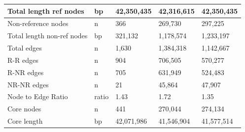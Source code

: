 \documentclass[../main.tex]{subfiles}
\begin{document}
\begin{table}[!htb]
\begin{center}
\begin{tabular}{|l|l|l|l|l|}
   \hline
   Total length ref nodes                    & bp                                 & 42,350,435                                       & 42,316,615                                  & 42,350,435                                     \\ 
   \hline
   Non-reference nodes                       & n                                  & 366                                              & 269,730                                     & 297,225                                        \\ 
   \hline
   Total length non-ref nodes                & bp                                 & 321,132                                          & 1,178,574                                   & 1,233,197                                      \\ 
   \hline
   Total edges                               & n                                  & 1,630                                            & 1,384,318                                   & 1,142,667                                      \\ 
   \hline
   R-R edges                                 & n                                  & 904                                              & 706,505                                     & 570,277                                        \\ 
   \hline
   R-NR edges                                & n                                  & 705                                              & 631,949                                     & 524,483                                        \\ 
   \hline
   NR-NR edges                               & n                                  & 21                                               & 45,864                                      & 47,907                                         \\ 
   \hline
   Node to Edge Ratio                        & ratio                              & 1.43                                             & 1.72                                        & 1.35                                           \\ 
   \hline
   Core nodes                                & n                                  & 441                                              & 270,044                                     & 274,134                                        \\ 
   \hline
   Core length                               & bp                                 & 42,071,986                                       & 41,546,904                                  & 41,577,514                                     \\ 

\end{tabular}
\end{center}
\end{table}
\end{document}
